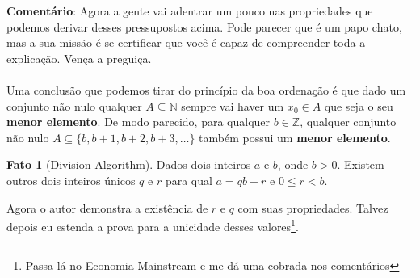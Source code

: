 \documentclass[a4paper,11pt]{book}
\theoremstyle{definition}
\newtheorem{fact}{Fato}[section]
\begin{document}
\textbf{Comentário}: Agora a gente vai adentrar um pouco nas propriedades que podemos derivar desses pressupostos acima. Pode parecer que é um papo chato, mas a sua missão é se certificar que você é capaz de compreender toda a explicação. Vença a preguiça.
\\
\\
Uma conclusão que podemos tirar do princípio da boa ordenação é que dado um conjunto não nulo qualquer $A \subseteq \mathbb{N}$ sempre vai haver um $x_0 \in A$ que seja o seu \textbf{menor elemento}. De modo parecido, para qualquer $b \in \mathbb{Z}$, qualquer conjunto não nulo $A \subseteq \{ b, b+1, b+2, b+3, \dots \}$ também possui um \textbf{menor elemento}.

\begin{fact}[Division Algorithm]
Dados dois inteiros $a$ e $b$, onde $b > 0$. Existem outros dois inteiros únicos $q$ e $r$ para qual $a = qb + r$ e $0 \leq r < b$.
\end{fact}

Agora o autor demonstra a existência de $r$ e $q$ com suas propriedades. Talvez depois eu estenda a prova para a unicidade desses valores\footnote{Passa lá no Economia Mainstream e me dá uma cobrada nos comentários}.
\end{document}
